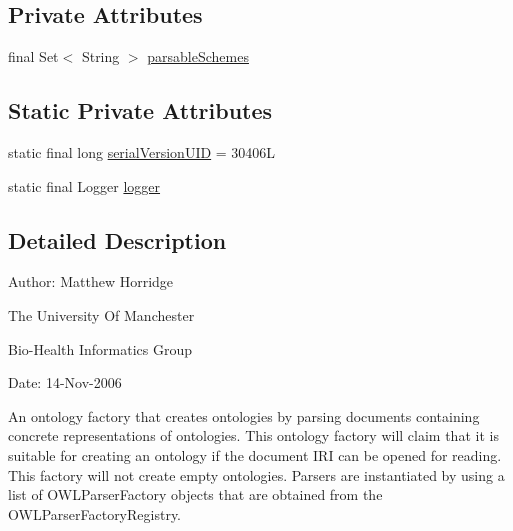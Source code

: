\subsection*{Private Attributes}
\begin{DoxyCompactItemize}
\item 
final Set$<$ String $>$ \hyperlink{classuk_1_1ac_1_1manchester_1_1cs_1_1owl_1_1owlapi_1_1_parsable_o_w_l_ontology_factory_a27c6ebf19446e98a74110ac03e7e6469}{parsable\-Schemes}
\end{DoxyCompactItemize}
\subsection*{Static Private Attributes}
\begin{DoxyCompactItemize}
\item 
static final long \hyperlink{classuk_1_1ac_1_1manchester_1_1cs_1_1owl_1_1owlapi_1_1_parsable_o_w_l_ontology_factory_a03e4f6fa7d136dad80c2ef02d5360550}{serial\-Version\-U\-I\-D} = 30406\-L
\item 
static final Logger \hyperlink{classuk_1_1ac_1_1manchester_1_1cs_1_1owl_1_1owlapi_1_1_parsable_o_w_l_ontology_factory_a62b2ce26af29605a43a12ad567e4dc0a}{logger}
\end{DoxyCompactItemize}


\subsection{Detailed Description}
Author\-: Matthew Horridge\par
 The University Of Manchester\par
 Bio-\/\-Health Informatics Group\par
 Date\-: 14-\/\-Nov-\/2006\par
 \par
 

An ontology factory that creates ontologies by parsing documents containing concrete representations of ontologies. This ontology factory will claim that it is suitable for creating an ontology if the document I\-R\-I can be opened for reading. This factory will not create empty ontologies. Parsers are instantiated by using a list of {\ttfamily O\-W\-L\-Parser\-Factory} objects that are obtained from the {\ttfamily O\-W\-L\-Parser\-Factory\-Registry}. 

